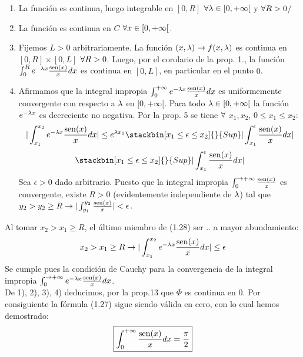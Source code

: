 \begin{enumerate}[1)]
\item La función \x \flecha \fxla \phantom{} es continua, luego integrable en $[0,R]$ $\forall \lambda \in [0,+\infty[$ y $\forall R>0$/
\item La función \lam \flecha \fxla \phantom{} es continua en $C$ $\forall x \in [0,+\infty[$. 
\item Fijemos $L>0$ arbitrariamente. La función $(x,\lambda)\rightarrow f(x,\lambda)$ es continua en $[0,R]\times [0,L]$ $\forall R>0$. Luego, por el corolario de la prop.  1., la función \lam \flecha $\int_0^R e^{- \lambda x}\frac{\operatorname{sen} (x)}{x}dx$ es continua en $[0,L]$, en particular en el punto $0$.
\item Afirmamos que la integral impropia $\int_0^{+\infty}e^{- \lambda x}\frac{\operatorname{sen} (x)}{x}dx$ es uniformemente convergente con respecto a $\lambda$ en $[0,+\infty[$.
Para todo $\lambda \in [0,+\infty[$ la función \x\flecha $e^{-\lambda x}$ es decreciente no negativa. Por la prop. 5 se tiene $\forall$ $x_1,x_2$, $0 \leq x_1 \leq x_2$:\\
\begin{equation}
| \int_{x_1}^{x_2}e^{- \lam x}\frac{\sen (x)}{x}dx | \leq e^{\lam x_1} \stackbin[x_1 \leq \epsilon \leq x_2]{}{Sup}| \int_{x_1}^\epsilon \frac{\sen (x)}{x}dx|
\end{equation}
\begin{equation*}
 \stackbin[x_1 \leq \epsilon \leq x_2]{}{Sup}| \int_{x_1}^\epsilon \frac{\sen (x)}{x}dx|
\end{equation*}
Sea $\epsilon >0$ dado arbitrario. Puesto que la integral impropia $\int_0^{\to +\infty}\frac{\operatorname{sen} (x)}{x}$ es convergente, existe $R>0$ (evidentemente independiente de $\lambda$) tal que $y_2>y_2\geq R \rightarrow | \int_{y_1}^{y_2}\frac{\operatorname{sen} (x)}{x}| < \epsilon$.
\end{enumerate}
Al tomar $x_2 >x_1 \geq R$, el último miembro de (1.28) ser ..
a mayor abundamiento: \\
$$x_2 >x_1  \geq R \rightarrow | \int_{x_1}^{x_2}e^{- \lambda x}\frac{\operatorname{sen} (x)}{x}dx| \leq \epsilon$$
Se cumple pues la condición de Cauchy para la convergencia de la integral impropia $\int_0^{\to +\infty}e^{- \lambda x}\frac{\operatorname{sen} (x)}{x}dx$.\\
De 1), 2), 3), 4) deducimos, por la prop.13 que $\Phi$ es continua en $0$. Por consiguiente la fórmula (1.27) sigue siendo válida en cero, con lo cual hemos demostrado: 
\begin{equation*}
\boxed{\int_0^{+\infty}\frac{\operatorname{sen} (x)}{x}dx=\frac{\pi}{2}}
\end{equation*}

